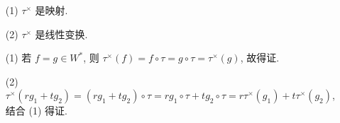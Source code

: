 \documentclass{note}
\begin{document}
\begin{itemize}
    \item[(1)] $\tau^{\times}$ 是映射.
    \item[(2)] $\tau^{\times}$ 是线性变换.
\end{itemize}
\begin{pf}
    \begin{itemize}
        \item[(1)] 若 $f=g\in W^*$, 则 $\tau^{\times}(f)=f\circ\tau=g\circ\tau=\tau^{\times}(g)$, 故得证.
        \item[(2)] $\tau^{\times}(rg_1+tg_2)=(rg_1+tg_2)\circ\tau=rg_1\circ\tau+tg_2\circ\tau=r\tau^{\times}(g_1)+t\tau^{\times}(g_2)$, 结合 (1) 得证.
    \end{itemize}
\end{pf}
\end{document}
